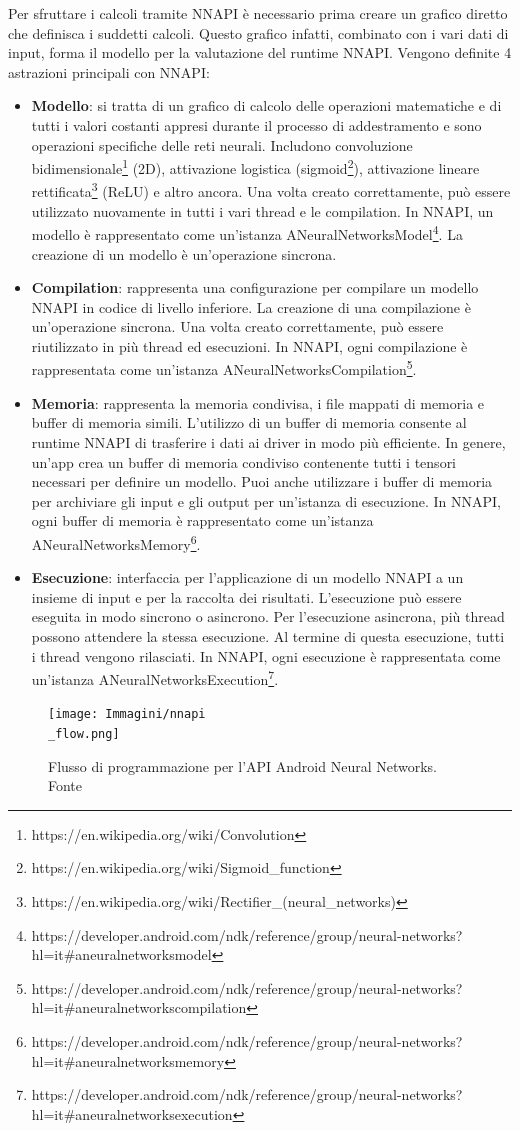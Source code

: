 Per sfruttare i calcoli tramite NNAPI è necessario prima creare un grafico diretto che definisca i suddetti calcoli. Questo grafico infatti, combinato con
i vari dati di input, forma il modello per la valutazione del runtime NNAPI. Vengono definite 4 astrazioni principali con NNAPI:
\begin{itemize}
    \item \textbf{Modello}: si tratta di un grafico di calcolo delle operazioni matematiche e di tutti i valori costanti appresi durante il processo
    di addestramento e sono operazioni specifiche delle reti neurali. Includono convoluzione bidimensionale\footnote{https://en.wikipedia.org/wiki/Convolution}
    (2D), attivazione logistica (sigmoid\footnote{https://en.wikipedia.org/wiki/Sigmoid\_function}), attivazione lineare rettificata\footnote{https://en.wikipedia.org/wiki/Rectifier\_(neural\_networks)}
    (ReLU) e altro ancora. Una volta creato correttamente, può essere utilizzato nuovamente in tutti i vari thread e le compilation. In NNAPI, un modello
    è rappresentato come un'istanza ANeuralNetworksModel\footnote{https://developer.android.com/ndk/reference/group/neural-networks?hl=it\#aneuralnetworksmodel}.
    La creazione di un modello è un'operazione sincrona.
    \item \textbf{Compilation}: rappresenta una configurazione per compilare un modello NNAPI in codice di livello inferiore. La creazione di una
    compilazione è un'operazione sincrona. Una volta creato correttamente, può essere riutilizzato in più thread ed esecuzioni. In NNAPI, ogni
    compilazione è rappresentata come un'istanza ANeuralNetworksCompilation\footnote{https://developer.android.com/ndk/reference/group/neural-networks?hl=it\#aneuralnetworkscompilation}.
    \item \textbf{Memoria}: rappresenta la memoria condivisa, i file mappati di memoria e buffer di memoria simili. L'utilizzo di un buffer di memoria
    consente al runtime NNAPI di trasferire i dati ai driver in modo più efficiente. In genere, un'app crea un buffer di memoria condiviso contenente
    tutti i tensori necessari per definire un modello. Puoi anche utilizzare i buffer di memoria per archiviare gli input e gli output per un'istanza di
    esecuzione. In NNAPI, ogni buffer di memoria è rappresentato come un'istanza ANeuralNetworksMemory\footnote{https://developer.android.com/ndk/reference/group/neural-networks?hl=it\#aneuralnetworksmemory}.
    \item \textbf{Esecuzione}: interfaccia per l'applicazione di un modello NNAPI a un insieme di input e per la raccolta dei risultati. L'esecuzione
    può essere eseguita in modo sincrono o asincrono. Per l'esecuzione asincrona, più thread possono attendere la stessa esecuzione. Al termine di questa
    esecuzione, tutti i thread vengono rilasciati. In NNAPI, ogni esecuzione è rappresentata come un'istanza ANeuralNetworksExecution\footnote{https://developer.android.com/ndk/reference/group/neural-networks?hl=it\#aneuralnetworksexecution}.
\end{itemize}

\begin{figure}
    \centering
    \texttt{[image: Immagini/nnapi\\\_flow.png]}
    \caption{Flusso di programmazione per l'API Android Neural Networks. Fonte \cite{NNAPI}}
    \label{}
\end{figure}

